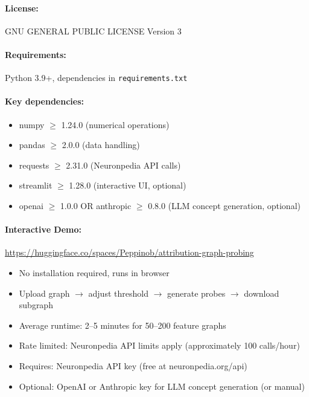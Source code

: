 \paragraph{License:} GNU GENERAL PUBLIC LICENSE Version 3

\paragraph{Requirements:} Python 3.9+, dependencies in \texttt{requirements.txt}

\paragraph{Key dependencies:}
\begin{itemize}
  \item numpy $\ge$ 1.24.0 (numerical operations)
  \item pandas $\ge$ 2.0.0 (data handling)
  \item requests $\ge$ 2.31.0 (Neuronpedia API calls)
  \item streamlit $\ge$ 1.28.0 (interactive UI, optional)
  \item openai $\ge$ 1.0.0 OR anthropic $\ge$ 0.8.0 (LLM concept generation, optional)
\end{itemize}

\paragraph{Interactive Demo:} \url{https://huggingface.co/spaces/Peppinob/attribution-graph-probing}  
\begin{itemize}
  \item No installation required, runs in browser
  \item Upload graph $\rightarrow$ adjust threshold $\rightarrow$ generate probes $\rightarrow$ download subgraph
  \item Average runtime: 2--5 minutes for 50--200 feature graphs
  \item Rate limited: Neuronpedia API limits apply (approximately 100 calls/hour)
  \item Requires: Neuronpedia API key (free at neuronpedia.org/api)
  \item Optional: OpenAI or Anthropic key for LLM concept generation (or manual)
\end{itemize}

